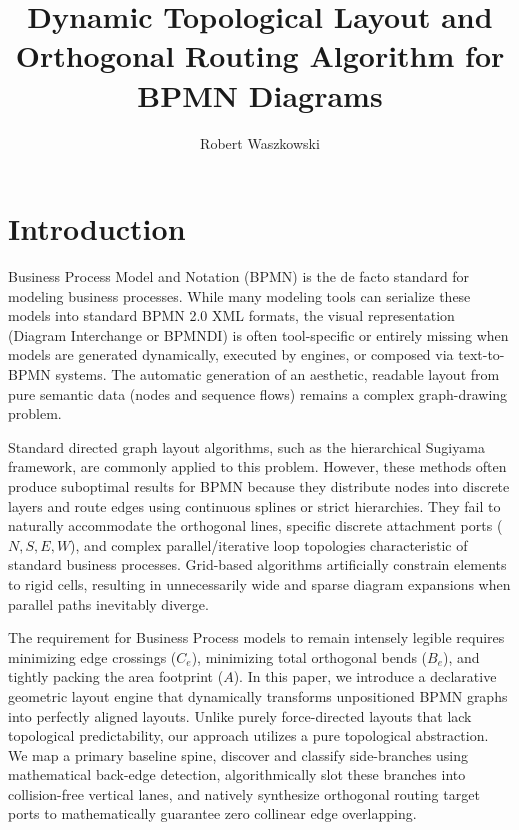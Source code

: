 \documentclass[fleqn,10pt]{wlscirep}
\title{Dynamic Topological Layout and Orthogonal Routing Algorithm for BPMN Diagrams}
\author[1,*]{Robert Waszkowski}
\affil[1]{Affiliation, department, city, postcode, country}
\affil[*]{corresponding.author@example.com}
\begin{document}
\flushbottom
\maketitle
\thispagestyle{empty}

\section*{Introduction}
Business Process Model and Notation (BPMN) is the de facto standard for modeling business processes. While many modeling tools can serialize these models into standard BPMN 2.0 XML formats, the visual representation (Diagram Interchange or BPMNDI) is often tool-specific or entirely missing when models are generated dynamically, executed by engines, or composed via text-to-BPMN systems. The automatic generation of an aesthetic, readable layout from pure semantic data (nodes and sequence flows) remains a complex graph-drawing problem. 

Standard directed graph layout algorithms, such as the hierarchical Sugiyama framework\cite{Sugiyama1981}, are commonly applied to this problem. However, these methods often produce suboptimal results for BPMN because they distribute nodes into discrete layers and route edges using continuous splines or strict hierarchies. They fail to naturally accommodate the orthogonal lines, specific discrete attachment ports ($N, S, E, W$), and complex parallel/iterative loop topologies characteristic of standard business processes. Grid-based algorithms\cite{Kitzmann2009} artificially constrain elements to rigid cells, resulting in unnecessarily wide and sparse diagram expansions when parallel paths inevitably diverge.

The requirement for Business Process models to remain intensely legible requires minimizing edge crossings ($C_e$), minimizing total orthogonal bends ($B_e$), and tightly packing the area footprint ($A$). In this paper, we introduce a declarative geometric layout engine that dynamically transforms unpositioned BPMN graphs into perfectly aligned layouts. Unlike purely force-directed layouts\cite{Fruchterman1991} that lack topological predictability, our approach utilizes a pure topological abstraction. We map a primary baseline spine, discover and classify side-branches using mathematical back-edge detection, algorithmically slot these branches into collision-free vertical lanes, and natively synthesize orthogonal routing target ports to mathematically guarantee zero collinear edge overlapping.
\end{document}

